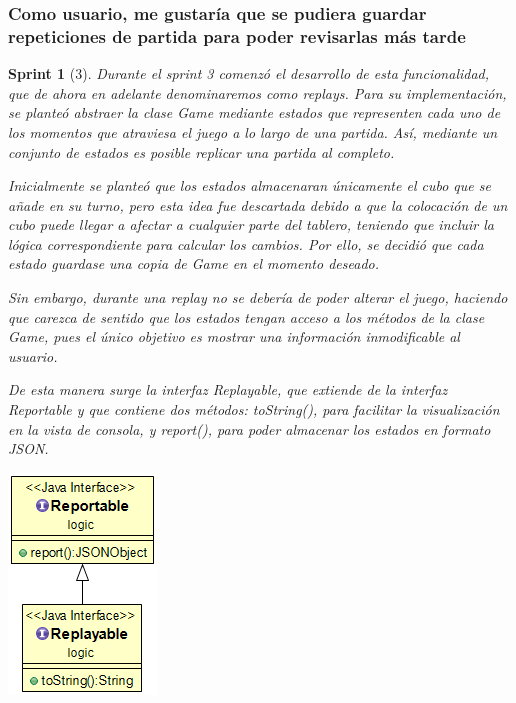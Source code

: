\documentclass{article}
\theoremstyle{break}
\newtheorem*{sprint}{Sprint}
\begin{document}
\subsubsection{Como usuario, me gustaría que se pudiera guardar repeticiones de partida para poder revisarlas más tarde}
\begin{sprint}[3]
Durante el sprint 3 comenzó el desarrollo de esta funcionalidad, que de ahora en adelante denominaremos como \textit{replays}. Para su implementación, se planteó abstraer la clase Game mediante estados que representen cada uno de los momentos que atraviesa el juego a lo largo de una partida. Así, mediante un conjunto de estados es posible replicar una partida al completo.

Inicialmente se planteó que los estados almacenaran únicamente el cubo que se añade en su turno, pero esta idea fue descartada debido a que la colocación de un cubo puede llegar a afectar a cualquier parte del tablero, teniendo que incluir la lógica correspondiente para calcular los cambios. Por ello, se decidió que cada estado guardase una copia de \textit{Game} en el momento deseado.

Sin embargo, durante una \textit{replay} no se debería de poder alterar el juego, haciendo que carezca de sentido que los estados tengan acceso a  los métodos de la clase \textit{Game}, pues el único objetivo es mostrar una información inmodificable al usuario.

De esta manera surge la interfaz \textit{Replayable}, que extiende de la interfaz \textit{Reportable} y que contiene dos métodos: \textit{toString()}, para facilitar la visualización en la vista de consola, y \textit{report()}, para poder almacenar los estados en formato JSON.

\begin{center}
\includegraphics[scale=0.5]{replayable-reportable-sprint-3.png}
\end{center}


\end{sprint}
\end{document}
